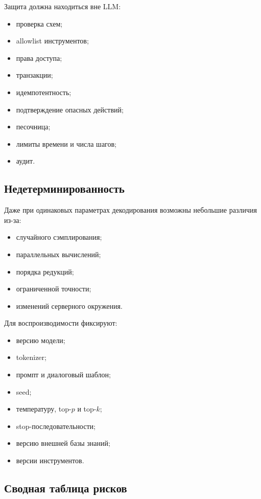 \documentclass[12pt,a4paper]{article}
\newcommand{\1}{\mathbf{1}}
\theoremstyle{definition}
\theoremstyle{remark}
\begin{document}
Защита должна находиться вне LLM:

\begin{itemize}
    \item проверка схем;
    \item allowlist инструментов;
    \item права доступа;
    \item транзакции;
    \item идемпотентность;
    \item подтверждение опасных действий;
    \item песочница;
    \item лимиты времени и числа шагов;
    \item аудит.
\end{itemize}

\subsection{Недетерминированность}

Даже при одинаковых параметрах декодирования возможны небольшие различия
из-за:

\begin{itemize}
    \item случайного сэмплирования;
    \item параллельных вычислений;
    \item порядка редукций;
    \item ограниченной точности;
    \item изменений серверного окружения.
\end{itemize}

Для воспроизводимости фиксируют:

\begin{itemize}
    \item версию модели;
    \item tokenizer;
    \item промпт и диалоговый шаблон;
    \item seed;
    \item температуру, top-$p$ и top-$k$;
    \item stop-последовательности;
    \item версию внешней базы знаний;
    \item версии инструментов.
\end{itemize}

\subsection{Сводная таблица рисков}
\end{document}
